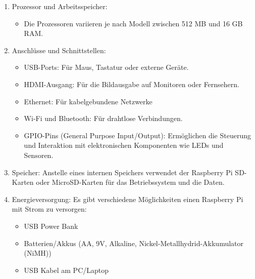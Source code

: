\begin{enumerate}
    \item Prozessor und Arbeitsspeicher:
    \begin{itemize}
        \item Die Prozessoren variieren je nach Modell zwischen 512 MB und 16 GB RAM. 
    \end{itemize}
    \item Anschlüsse und Schnittstellen:
     \begin{itemize}
        \item USB-Ports: Für Maus, Tastatur oder externe Geräte.
        \item HDMI-Ausgang: Für die Bildausgabe auf Monitoren oder Fernsehern.
        \item Ethernet: Für kabelgebundene Netzwerke
        \item Wi-Fi und Bluetooth: Für drahtlose Verbindungen.
        \item GPIO-Pins (General Purpose Input/Output): Ermöglichen die Steuerung und Interaktion mit elektronischen Komponenten wie LEDs und Sensoren.
    \end{itemize}
    \item Speicher:
    \newline Anstelle eines internen Speichers verwendet der Raspberry Pi SD-Karten oder MicroSD-Karten für das Betriebssystem und die Daten.
    \item Energieversorgung:
    \newline Es gibt verschiedene Möglichkeiten einen Raspberry Pi mit Strom zu versorgen:
    \begin{itemize}
        \item USB Power Bank
        \item Batterien/Akkus (AA, 9V, Alkaline, Nickel-Metallhydrid-Akkumulator (NiMH))
        \item USB Kabel am PC/Laptop
    \end{itemize}   
\end{enumerate}


 
\newpage
